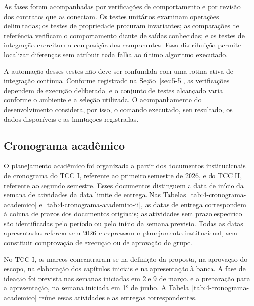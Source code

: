 As fases foram acompanhadas por verificações de comportamento e por revisão dos contratos que as conectam. Os testes unitários examinam operações delimitadas; os testes de propriedade procuram invariantes; as comparações de referência verificam o comportamento diante de saídas conhecidas; e os testes de integração exercitam a composição dos componentes. Essa distribuição permite localizar diferenças sem atribuir toda falha ao último algoritmo executado.

A automação desses testes não deve ser confundida com uma rotina ativa de integração contínua. Conforme registrado na Seção~\ref{sec:5-5}, as verificações dependem de execução deliberada, e o conjunto de testes alcançado varia conforme o ambiente e a seleção utilizada. O acompanhamento do desenvolvimento considera, por isso, o comando executado, seu resultado, os dados disponíveis e as limitações registradas.

\subsection{Cronograma acadêmico}

O planejamento acadêmico foi organizado a partir dos documentos institucionais de cronograma do TCC I, referente ao primeiro semestre de 2026, e do TCC II, referente ao segundo semestre. Esses documentos distinguem a data de início da semana de atividades da data limite de entrega. Nas Tabelas~\ref{tab:4-cronograma-academico} e~\ref{tab:4-cronograma-academico-ii}, as datas de entrega correspondem à coluna de prazos dos documentos originais; as atividades sem prazo específico são identificadas pelo período ou pelo início da semana previsto. Todas as datas apresentadas referem-se a 2026 e expressam o planejamento institucional, sem constituir comprovação de execução ou de aprovação do grupo.

No TCC I, os marcos concentraram-se na definição da proposta, na aprovação do escopo, na elaboração dos capítulos iniciais e na apresentação à banca. A fase de ideação foi prevista nas semanas iniciadas em 2 e 9 de março, e a preparação para a apresentação, na semana iniciada em 1º de junho. A Tabela~\ref{tab:4-cronograma-academico} reúne essas atividades e as entregas correspondentes.

